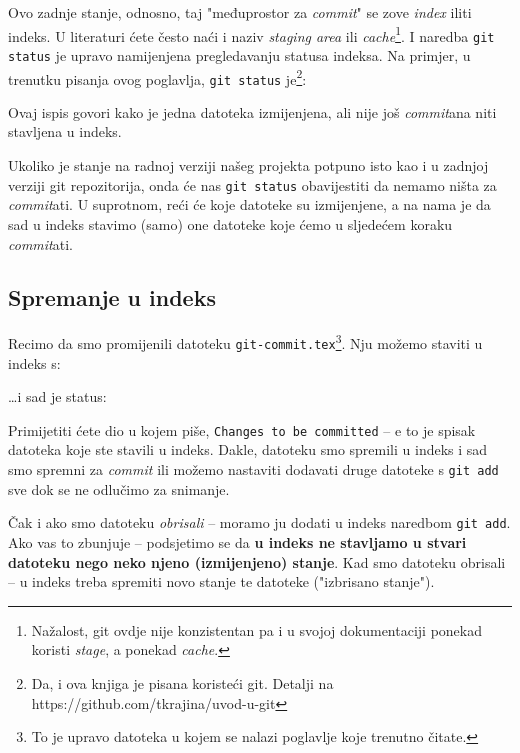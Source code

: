 Ovo zadnje stanje, odnosno, taj "međuprostor za \emph{commit}" se zove \emph{index} iliti indeks.
U literaturi ćete često naći i naziv \emph{staging area} ili \emph{cache}\footnote{Nažalost, git ovdje nije konzistentan pa i u svojoj dokumentaciji ponekad koristi \emph{stage}, a ponekad \emph{cache}.}.
I naredba \verb+git status+ je upravo namijenjena pregledavanju statusa indeksa.
Na primjer, u trenutku pisanja ovog poglavlja, \verb+git status+ je\footnote{Da, i ova knjiga je pisana koristeći git. Detalji na https://github.com/tkrajina/uvod-u-git}:



Ovaj ispis govori kako je jedna datoteka izmijenjena, ali nije još \emph{commit}ana niti stavljena u indeks.

Ukoliko je stanje na radnoj verziji našeg projekta potpuno isto kao i u zadnjoj verziji git repozitorija, onda će nas \verb+git status+ obavijestiti da nemamo ništa za \emph{commit}ati.
U suprotnom, reći će koje datoteke su izmijenjene, a na nama je da sad u indeks stavimo (samo) one datoteke koje ćemo u sljedećem koraku \emph{commit}ati.

\subsection*{Spremanje u indeks}

Recimo da smo promijenili datoteku \verb+git-commit.tex+\footnote{To je upravo datoteka u kojem se nalazi poglavlje koje trenutno čitate.}.
Nju možemo staviti u indeks s:


\dots{}i sad je status:



Primijetiti ćete dio u kojem piše, \verb+Changes to be committed+ -- e to je spisak datoteka koje ste stavili u indeks.
Dakle, datoteku smo spremili u indeks i sad smo spremni za \emph{commit} ili možemo nastaviti dodavati druge datoteke s \verb+git add+ sve dok se ne odlučimo za snimanje.

Čak i ako smo datoteku \emph{obrisali} -- moramo ju dodati u indeks naredbom \verb+git add+.
Ako vas to zbunjuje -- podsjetimo se da \textbf{u indeks ne stavljamo u stvari datoteku nego neko njeno (izmijenjeno) stanje}.
Kad smo datoteku obrisali -- u indeks treba spremiti novo stanje te datoteke ("izbrisano stanje").

